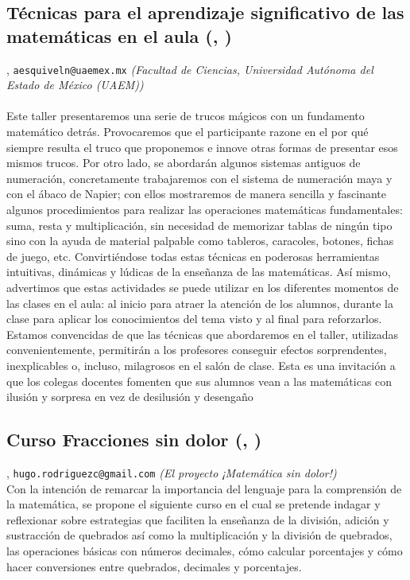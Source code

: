 \subsection{\sffamily Técnicas para el aprendizaje significativo de las matemáticas en el aula {\footnotesize (, )}} \label{reg-1105} 
, {\tt aesquiveln@uaemex.mx}  {\slshape (Facultad de Ciencias, Universidad Autónoma del Estado de México (UAEM))}\\
\\
\noindent Este taller presentaremos una serie de trucos mágicos con un fundamento matemático detrás. Provocaremos que el participante razone en el por qué siempre resulta el truco que proponemos e innove otras formas de presentar esos mismos trucos. Por otro lado,  se abordarán algunos sistemas antiguos de numeración, concretamente trabajaremos con el sistema de numeración maya y con el ábaco de Napier; con ellos mostraremos de manera sencilla y fascinante algunos procedimientos para realizar las operaciones matemáticas fundamentales: suma, resta y multiplicación, sin necesidad de memorizar tablas de ningún tipo sino con la ayuda de material palpable como tableros, caracoles, botones, fichas de juego, etc. Convirtiéndose todas estas técnicas en poderosas herramientas intuitivas, dinámicas y lúdicas de la enseñanza de las matemáticas. Así mismo, advertimos que estas actividades se puede utilizar en los diferentes momentos de las clases en el aula: al inicio para atraer la atención de los alumnos, durante la clase para aplicar los conocimientos del tema visto y al final para reforzarlos. Estamos convencidas de que las técnicas que abordaremos en el taller, utilizadas convenientemente, permitirán a los profesores conseguir efectos sorprendentes, inexplicables o, incluso, milagrosos en el salón de clase. Esta es una invitación a que los colegas docentes fomenten que sus alumnos vean a las matemáticas con ilusión y sorpresa en vez de desilusión y desengaño
\subsection{\sffamily Curso Fracciones sin dolor {\footnotesize (, )}} \label{reg-1785} 
, {\tt hugo.rodriguezc@gmail.com}  {\slshape (El proyecto ¡Matemática sin dolor!)}\\
          \noindent Con la intención de remarcar la importancia del lenguaje para la comprensión de la matemática, se propone el siguiente curso en el cual se pretende indagar y reflexionar sobre  estrategias que faciliten la enseñanza de la división, adición y sustracción de quebrados así como la multiplicación y la división de quebrados, las operaciones básicas con números decimales, cómo calcular porcentajes y cómo hacer conversiones entre quebrados, decimales y porcentajes.

